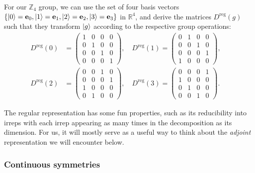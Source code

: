 \begin{example}
\label{example:01_z4_regular}
For our $\mathbb Z_4$ group, we can use the set of four basis vectors $\{\ket{0} = \mathbf{e}_0, \ket{1} = \mathbf{e}_1, \ket{2} = \mathbf{e}_2, \ket{3} = \mathbf{e}_3\}$ in $\mathbb R^4$, and derive the matrices $D^{\mathrm{reg}}(g)$ such that they transform $\ket{g}$ according to the respective group operations:
\setlength{\arraycolsep}{10pt}
\begin{equation} \begin{split}
	\label{eq:01_z4_regular}
	D^{\mathrm{reg}}(0) &= \begin{pmatrix}
		1 & 0 & 0 & 0 \\
		0 & 1 & 0 & 0 \\
		0 & 0 & 1 & 0 \\
		0 & 0 & 0 & 1
	\end{pmatrix}, \quad
	D^{\mathrm{reg}}(1) = \begin{pmatrix}
		0 & 1 & 0 & 0 \\
		0 & 0 & 1 & 0 \\
		0 & 0 & 0 & 1 \\
		1 & 0 & 0 & 0
	\end{pmatrix}, \quad \\[1em]
	D^{\mathrm{reg}}(2) &= \begin{pmatrix}
		0 & 0 & 1 & 0 \\
		0 & 0 & 0 & 1 \\
		1 & 0 & 0 & 0 \\
		0 & 1 & 0 & 0
	\end{pmatrix}, \quad
	D^{\mathrm{reg}}(3) = \begin{pmatrix}
		0 & 0 & 0 & 1 \\
		1 & 0 & 0 & 0 \\
		0 & 1 & 0 & 0 \\
		0 & 0 & 1 & 0
	\end{pmatrix}.
\end{split} \end{equation}
\end{example}

The regular representation has some fun properties, such as its reducibility into irreps with each irrep appearing as many times in the decomposition as its dimension.
For us, it will mostly serve as a useful way to think about the \textit{adjoint} representation we will encounter below.

\subsubsection{Continuous symmetries}
\label{sec:01_symmetries_continuous}


